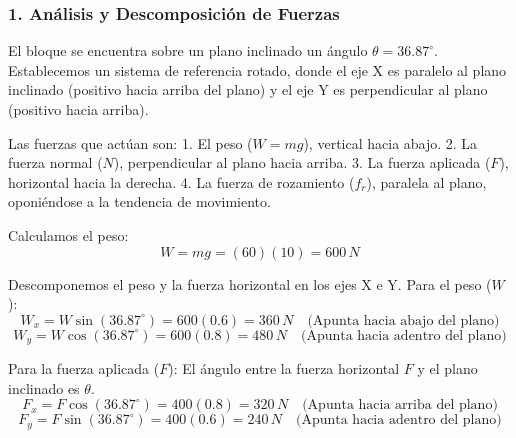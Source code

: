 \documentclass[12pt, a4paper]{article}
\begin{document}
\subsubsection*{1. Análisis y Descomposición de Fuerzas}
El bloque se encuentra sobre un plano inclinado un ángulo $\theta = 36.87^\circ$. Establecemos un sistema de referencia rotado, donde el eje X es paralelo al plano inclinado (positivo hacia arriba del plano) y el eje Y es perpendicular al plano (positivo hacia arriba).

Las fuerzas que actúan son:
1. El peso ($W = mg$), vertical hacia abajo.
2. La fuerza normal ($N$), perpendicular al plano hacia arriba.
3. La fuerza aplicada ($F$), horizontal hacia la derecha.
4. La fuerza de rozamiento ($f_r$), paralela al plano, oponiéndose a la tendencia de movimiento.

Calculamos el peso:
$$ W = m g = (60)(10) = 600 \, \si{N} $$

Descomponemos el peso y la fuerza horizontal en los ejes X e Y.
Para el peso ($W$):
$$ W_x = W \sin(36.87^\circ) = 600(0.6) = 360 \, \si{N} \quad \text{(Apunta hacia abajo del plano)} $$
$$ W_y = W \cos(36.87^\circ) = 600(0.8) = 480 \, \si{N} \quad \text{(Apunta hacia adentro del plano)} $$

Para la fuerza aplicada ($F$):
El ángulo entre la fuerza horizontal $F$ y el plano inclinado es $\theta$.
$$ F_x = F \cos(36.87^\circ) = 400(0.8) = 320 \, \si{N} \quad \text{(Apunta hacia arriba del plano)} $$
$$ F_y = F \sin(36.87^\circ) = 400(0.6) = 240 \, \si{N} \quad \text{(Apunta hacia adentro del plano)} $$
\end{document}
